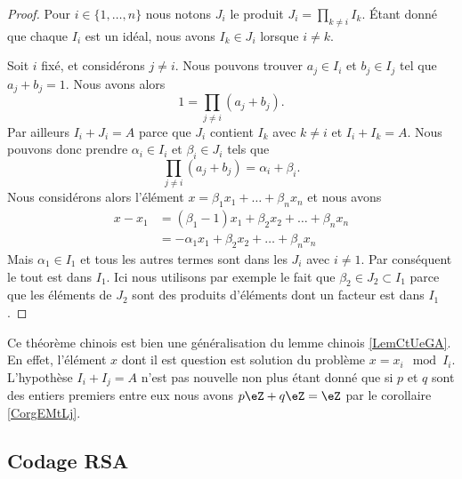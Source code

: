 \begin{proof}
    Pour \( i\in\{ 1,\ldots,n \}\) nous notons \( J_i\) le produit \( J_i=\prod_{k\neq i}I_k\). Étant donné que chaque \( I_i\) est un idéal, nous avons \( I_k\in J_i\) lorsque \( i\neq k\).

    Soit \( i\) fixé, et considérons \( j\neq i\). Nous pouvons trouver \( a_j\in I_i\) et \( b_j\in I_j\) tel que \( a_j+b_j=1\). Nous avons alors
    \begin{equation}
        1=\prod_{j\neq i}(a_j+b_j).
    \end{equation}
    Par ailleurs \( I_i+J_i=A\) parce que \( J_i\) contient \( I_k\) avec \( k\neq i\) et \( I_i+I_k=A\). Nous pouvons donc prendre \( \alpha_i\in I_i\) et \( \beta_i\in J_i\) tels que
    \begin{equation}
        \prod_{j\neq i}(a_j+b_j)=\alpha_i+\beta_i.
    \end{equation}
    Nous considérons alors l'élément \( x=\beta_1x_1+\ldots+\beta_nx_n\) et nous avons
    \begin{subequations}
        \begin{align}
            x-x_1&=(\beta_1-1)x_1+\beta_2x_2+\ldots+\beta_nx_n\\
            &=-\alpha_1x_1+\beta_2x_2+\ldots+\beta_nx_n
        \end{align}
    \end{subequations}
    Mais \( \alpha_1\in I_1\) et tous les autres termes sont dans les \( J_i\) avec \( i\neq 1\). Par conséquent le tout est dans \( I_1\). Ici nous utilisons par exemple le fait que \( \beta_2\in J_2\subset I_1\) parce que les éléments de \( J_2\) sont des produits d'éléments dont un facteur est dans \( I_1\).
\end{proof}

\begin{remark}
    Ce théorème chinois est bien une généralisation du lemme chinois \ref{LemCtUeGA}. En effet, l'élément \( x\) dont il est question est solution du problème \( x=x_i\mod I_i\). L'hypothèse \( I_i+I_j=A\) n'est pas nouvelle non plus étant donné que si \( p\) et \( q\) sont des entiers premiers entre eux nous avons \( p\eZ+q\eZ=\eZ\) par le corollaire \ref{CorgEMtLj}.
\end{remark}

\subsection{Codage RSA}
\label{SecEVaFYi}


